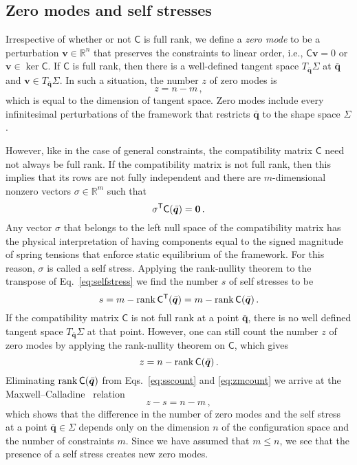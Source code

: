 \subsection{Zero modes and self stresses}

Irrespective of whether or not $\mathsf{C}$ is full rank, we define a \emph{zero mode} to be a perturbation $\bm{v} \in \mathbb{R}^n$ that preserves the constraints to linear order, i.e., $\mathsf{C}\bm{v} = 0$ or $\bm{v} \in \ker \mathsf{C}$.
If $\mathsf{C}$ is full rank, then there is a well-defined tangent space $T_{\bar{\bm{q}}}\Sigma$ at $\bar{\bm{q}}$ and $\bm{v} \in T_{\bar{\bm{q}}} \Sigma$.
In such a situation, the number $z$ of zero modes is
%
\begin{equation}
  z = n - m\,,
\end{equation}
%
which is equal to the dimension of tangent space.
Zero modes include every infinitesimal perturbations of the framework that restricts $\bar{\bm{q}}$ to the shape space $\Sigma$.

However, like in the case of general constraints, the compatibility matrix $\mathsf{C}$ need not always be full rank.
If the compatibility matrix is not full rank, then this implies that its rows are not fully independent and there are $m$-dimensional nonzero vectors $\sigma \in \mathbb{R}^m$ such that
\begin{equation}
  \sigma^\mathsf{T}\mathsf{C}(\bar{\bm{q}}) = \bm{0}\,.\label{eq:selfstress}
\end{equation}
Any vector $\sigma$ that belongs to the left null space of the compatibility matrix has the physical interpretation of having components equal to  the signed magnitude of spring tensions that enforce static equilibrium of the framework.
For this reason, $\sigma$ is called a self stress.
Applying the rank-nullity theorem to the transpose of Eq.~\eqref{eq:selfstress} we find the number $s$ of self stresses to be
\begin{equation}
  s = m - \operatorname{rank}{\mathsf{C}^\mathsf{T}(\bar{\bm{q}})} = m - \operatorname{rank}{\mathsf{C}(\bar{\bm{q}})}\,.\label{eq:sscount}
\end{equation}
If the compatibility matrix $\mathsf{C}$ is not full rank at a point $\bar{\bm{q}}$, there is no well defined tangent space $T_{\bar{\bm{q}}}\Sigma$ at that point.
However, one can still count the number $z$ of zero modes by applying the rank-nullity theorem on $\mathsf{C}$, which gives
\begin{equation}
  z = n - \operatorname{rank}{\mathsf{C}(\bar{\bm{q}})}\label{eq:zmcount}\,.
\end{equation}
Eliminating $\operatorname{rank}{\mathsf{C}(\bar{\bm{q}})}$ from Eqs.~\eqref{eq:sscount} and \eqref{eq:zmcount} we arrive at the Maxwell--Calladine~\cite{maxwell1864,calladine1978} relation
%
\begin{equation}
  z - s = n - m\,,\label{eq:mcindex}
\end{equation}
%
which shows that the difference in the number of zero modes and the self stress at a point $\bar{\bm{q}} \in \Sigma$ depends only on the dimension $n$ of the configuration space and the number of constraints $m$.
Since we have assumed that $m \leq n$, we see that the presence of a self stress creates new zero modes.

